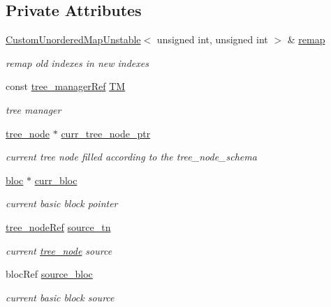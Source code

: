 \subsection*{Private Attributes}
\begin{DoxyCompactItemize}
\item 
\hyperlink{custom__map_8hpp_a8cbaceffc09790a885ec7e9c17809c69}{Custom\+Unordered\+Map\+Unstable}$<$ unsigned int, unsigned int $>$ \& \hyperlink{structtree__node__index__factory_aacc6d68897f233f06d8607ff3f6f68a7}{remap}
\begin{DoxyCompactList}\small\item\em remap old indexes in new indexes \end{DoxyCompactList}\item 
const \hyperlink{tree__manager_8hpp_a96ff150c071ce11a9a7a1e40590f205e}{tree\+\_\+manager\+Ref} \hyperlink{structtree__node__index__factory_ab319ce8e22c4b63339fe9a0cc13949ed}{TM}
\begin{DoxyCompactList}\small\item\em tree manager \end{DoxyCompactList}\item 
\hyperlink{classtree__node}{tree\+\_\+node} $\ast$ \hyperlink{structtree__node__index__factory_a1eba0c6ceb03b663751e2711a07d7351}{curr\+\_\+tree\+\_\+node\+\_\+ptr}
\begin{DoxyCompactList}\small\item\em current tree node filled according to the tree\+\_\+node\+\_\+schema \end{DoxyCompactList}\item 
\hyperlink{structbloc}{bloc} $\ast$ \hyperlink{structtree__node__index__factory_a84b2c755444f77c635ea4bc075ffac8f}{curr\+\_\+bloc}
\begin{DoxyCompactList}\small\item\em current basic block pointer \end{DoxyCompactList}\item 
\hyperlink{tree__node_8hpp_a6ee377554d1c4871ad66a337eaa67fd5}{tree\+\_\+node\+Ref} \hyperlink{structtree__node__index__factory_ac21ab88bd0b167ddccc5539872cefa25}{source\+\_\+tn}
\begin{DoxyCompactList}\small\item\em current \hyperlink{classtree__node}{tree\+\_\+node} source \end{DoxyCompactList}\item 
bloc\+Ref \hyperlink{structtree__node__index__factory_abf9ca318ab04e999de334660fe60a575}{source\+\_\+bloc}
\begin{DoxyCompactList}\small\item\em current basic block source \end{DoxyCompactList}\end{DoxyCompactItemize}


